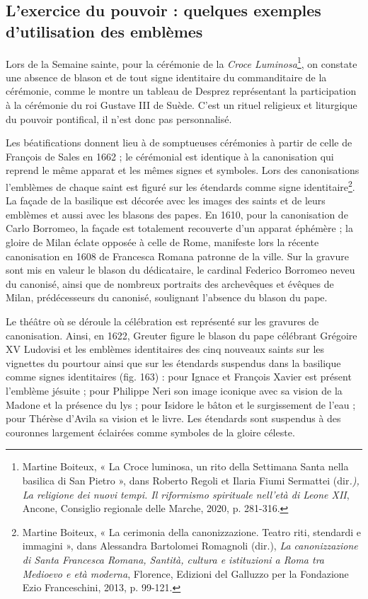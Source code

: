\documentclass[12pt,twoside,openany]{book}
\begin{document}
\subsection{L’exercice du pouvoir : quelques exemples d’utilisation des emblèmes}

Lors de la Semaine sainte, pour la cérémonie de la \textit{Croce Luminosa}\footnote{Martine Boiteux, « La Croce luminosa, un rito della Settimana Santa nella basilica di San Pietro », dans Roberto Regoli et Ilaria Fiumi Sermattei (dir\textit{.), La religione dei nuovi tempi. Il riformismo spirituale nell’età di Leone XII}, Ancone, Consiglio regionale delle Marche, 2020, p. 281-316.}, on constate une absence de blason et de tout signe identitaire du commanditaire de la cérémonie, comme le montre un tableau de Desprez représentant la participation à la cérémonie du roi Gustave III de Suède. C’est un rituel religieux et liturgique du pouvoir pontifical, il n’est donc pas personnalisé.

Les béatifications donnent lieu à de somptueuses cérémonies à partir de celle de François de Sales en 1662 ; le cérémonial est identique à la canonisation qui reprend le même apparat et les mêmes signes et symboles. Lors des canonisations l’emblèmes de chaque saint est figuré sur les étendards comme signe identitaire\footnote{Martine Boiteux, « La cerimonia della canonizzazione. Teatro riti, stendardi e immagini », dans Alessandra Bartolomei Romagnoli (dir.), \textit{La canonizzazione di Santa Francesca Romana, Santità, cultura e istituzioni a Roma tra Medioevo e età moderna}, Florence, Edizioni del Galluzzo per la Fondazione Ezio Franceschini, 2013, p. 99-121.}. La façade de la basilique est décorée avec les images des saints et de leurs emblèmes et aussi avec les blasons des papes. En 1610, pour la canonisation de Carlo Borromeo, la façade est totalement recouverte d’un apparat éphémère ; la gloire de Milan éclate opposée à celle de Rome, manifeste lors la récente canonisation en 1608 de Francesca Romana patronne de la ville. Sur la gravure sont mis en valeur le blason du dédicataire, le cardinal Federico Borromeo neveu du canonisé, ainsi que de nombreux portraits des archevêques et évêques de Milan, prédécesseurs du canonisé, soulignant l’absence du blason du pape.

Le théâtre où se déroule la célébration est représenté sur les gravures de canonisation. Ainsi, en 1622, Greuter figure le blason du pape célébrant Grégoire XV Ludovisi et les emblèmes identitaires des cinq nouveaux saints sur les vignettes du pourtour ainsi que sur les étendards suspendus dans la basilique comme signes identitaires (fig. 163) : pour Ignace et François Xavier est présent l’emblème jésuite ; pour Philippe Neri son image iconique avec sa vision de la Madone et la présence du lys ; pour Isidore le bâton et le surgissement de l’eau ; pour Thérèse d’Avila sa vision et le livre. Les étendards sont suspendus à des couronnes largement éclairées comme symboles de la gloire céleste.
\end{document}
